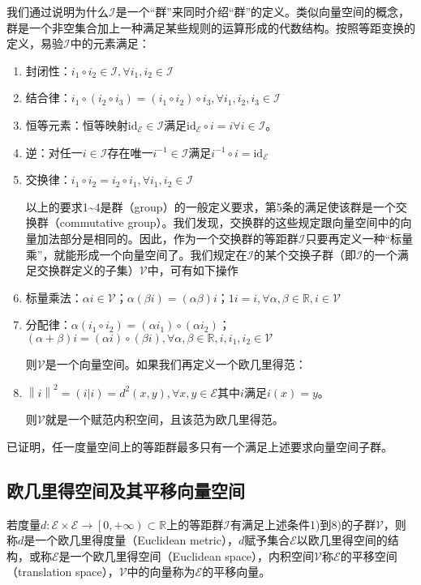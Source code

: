 \documentclass[main.tex]{subfiles}
\begin{document}
我们通过说明为什么$\mathcal{I}$是一个“群”来同时介绍“群”的定义。类似向量空间的概念，群是一个非空集合加上一种满足某些规则的运算形成的代数结构。按照等距变换的定义，易验$\mathcal{I}$中的元素满足：
\begin{enumerate}
    \item 封闭性：$i_1\circ i_2\in\mathcal{I},\forall i_1,i_2\in\mathcal{I}$
    \item 结合律：$i_1\circ \left(i_2\circ i_3\right)=\left(i_1\circ i_2\right)\circ i_3,\forall i_1,i_2,i_3\in\mathcal{I}$
    \item 恒等元素：恒等映射$\mathrm{id}_\mathcal{E}\in\mathcal{I}$满足$\mathrm{id}_\mathcal{E}\circ i=i\forall i\in\mathcal{I}$。
    \item 逆：对任一$i\in\mathcal{I}$存在唯一$i^{-1}\in\mathcal{I}$满足$i^{-1}\circ i=\mathrm{id}_\mathcal{E}$
    \item 交换律：$i_1\circ i_2=i_2\circ i_1,\forall i_1,i_2\in\mathcal{I}$
    
    以上的要求1\textasciitilde 4是群（group）的一般定义要求，第5条的满足使该群是一个交换群（commutative group）。我们发现，交换群的这些规定跟向量空间中的向量加法部分是相同的。因此，作为一个交换群的等距群$\mathcal{I}$只要再定义一种“标量乘”，就能形成一个向量空间了。我们规定在$\mathcal{I}$的某个交换子群（即$\mathcal{I}$的一个满足交换群定义的子集）$\mathcal{V}$中，可有如下操作
    
    \item 标量乘法：$\alpha i\in\mathcal{V}$；$\alpha\left(\beta i\right)=\left(\alpha\beta\right)i$；$1i=i,\forall\alpha,\beta\in\mathbb{R},i\in\mathcal{V}$
    \item 分配律：$\alpha\left(i_1\circ i_2\right)=\left(\alpha i_1\right)\circ\left(\alpha i_2\right)$；$\left(\alpha+\beta\right)i=\left(\alpha i\right)\circ\left(\beta i\right),\forall\alpha,\beta\in\mathbb{R},i,i_1,i_2\in\mathcal{V}$
    
    则$\mathcal{V}$是一个向量空间。如果我们再定义一个欧几里得范：
    
    \item $\left\|i\right\|^2=\left(i|i\right)= d^2\left(x,y\right),\forall x,y\in\mathcal{E}$其中$i$满足$i\left(x\right)=y$。
    
    则$\mathcal{V}$就是一个赋范内积空间，且该范为欧几里得范。
\end{enumerate}

已证明，任一度量空间上的等距群最多只有一个满足上述要求向量空间子群\cite{Noll1974}。

\subsection{欧几里得空间及其平移向量空间}
\begin{definition}[欧几里得空间]
若度量$d:\mathcal{E}\times\mathcal{E}\rightarrow\left[0,+\infty\right)\subset\mathbb{R}$上的等距群$\mathcal{I}$有满足上述条件1)到8)的子群$\mathcal{V}$，则称$d$是一个欧几里得度量（Euclidean metric），$d$赋予集合$\mathcal{E}$以欧几里得空间的结构，或称$\mathcal{E}$是一个欧几里得空间（Euclidean space），内积空间$\mathcal{V}$称$\mathcal{E}$的平移空间（translation space），$\mathcal{V}$中的向量称为$\mathcal{E}$的平移向量。
\end{definition}
\end{document}
